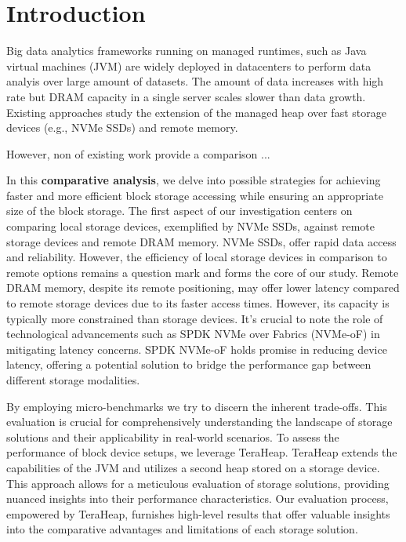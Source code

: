 \section{Introduction}

Big data analytics frameworks running on managed runtimes, such as Java virtual
machines (JVM) are widely deployed in datacenters to perform data analyis over
large amount of datasets. The amount of data increases with high rate but DRAM
capacity in a single server scales slower than data growth. Existing approaches
study the extension of the managed heap over fast storage devices (e.g., NVMe
SSDs) and remote memory.


%
However,  non of existing work provide a comparison ... 

In this \textbf{comparative analysis}, we delve into possible strategies for
achieving faster and more efficient block storage accessing while ensuring an
appropriate size of the block storage. The first aspect of our investigation
centers on comparing local storage devices, exemplified by NVMe SSDs, against
remote storage devices and remote DRAM memory. NVMe SSDs, offer rapid data
access and reliability. However, the efficiency of local storage devices in
comparison to remote options remains a question mark and forms the core of our
study. Remote DRAM memory, despite its remote positioning, may offer lower
latency compared to remote storage devices due to its faster access times.
However, its capacity is typically more constrained than storage devices. It's
crucial to note the role of technological advancements such as SPDK NVMe over
Fabrics (NVMe-oF) in mitigating latency concerns. SPDK NVMe-oF holds promise in
reducing device latency, offering a potential solution to bridge the performance
gap between different storage modalities. 

By employing micro-benchmarks we try to discern the inherent trade-offs. This
evaluation is crucial for comprehensively understanding the landscape of storage
solutions and their applicability in real-world scenarios. To assess the
performance of block device setups, we leverage TeraHeap. TeraHeap extends the
capabilities of the JVM and utilizes a second heap stored on a storage device.
This approach allows for a meticulous evaluation of storage solutions, providing
nuanced insights into their performance characteristics. Our evaluation process,
empowered by TeraHeap, furnishes high-level results that offer valuable insights
into the comparative advantages and limitations of each storage solution.

